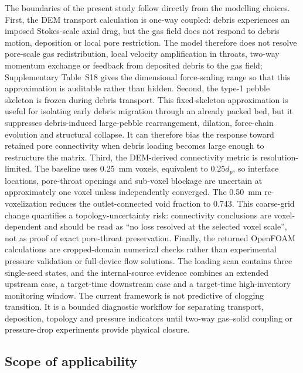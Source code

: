 \documentclass[preprint,12pt,authoryear]{elsarticle}
\begin{document}
The boundaries of the present study follow directly from the modelling choices. First, the DEM transport calculation is one-way coupled: debris experiences an imposed Stokes-scale axial drag, but the gas field does not respond to debris motion, deposition or local pore restriction. The model therefore does not resolve pore-scale gas redistribution, local velocity amplification in throats, two-way momentum exchange or feedback from deposited debris to the gas field; Supplementary Table~S18 gives the dimensional force-scaling range so that this approximation is auditable rather than hidden. Second, the type-1 pebble skeleton is frozen during debris transport. This fixed-skeleton approximation is useful for isolating early debris migration through an already packed bed, but it suppresses debris-induced large-pebble rearrangement, dilation, force-chain evolution and structural collapse. It can therefore bias the response toward retained pore connectivity when debris loading becomes large enough to restructure the matrix. Third, the DEM-derived connectivity metric is resolution-limited. The baseline uses \SI{0.25}{mm} voxels, equivalent to $0.25d_p$, so interface locations, pore-throat openings and sub-voxel blockage are uncertain at approximately one voxel unless independently converged. The \SI{0.50}{mm} re-voxelization reduces the outlet-connected void fraction to 0.743. This coarse-grid change quantifies a topology-uncertainty risk: connectivity conclusions are voxel-dependent and should be read as ``no loss resolved at the selected voxel scale'', not as proof of exact pore-throat preservation. Finally, the returned OpenFOAM calculations are cropped-domain numerical checks rather than experimental pressure validation or full-device flow solutions. The loading scan contains three single-seed states, and the internal-source evidence combines an extended upstream case, a target-time downstream case and a target-time high-inventory monitoring window. The current framework is not predictive of clogging transition. It is a bounded diagnostic workflow for separating transport, deposition, topology and pressure indicators until two-way gas--solid coupling or pressure-drop experiments provide physical closure.

\subsection{Scope of applicability}
\end{document}
